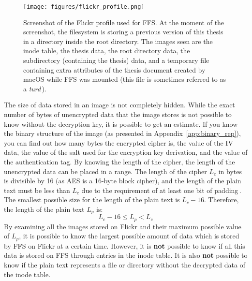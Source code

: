 \begin{figure}[!ht]
	\begin{center}
	  \texttt{[image: figures/flickr\_profile.png]}
	\end{center}
	\caption[Screenshot of the Flickr profile used for \gls{FFS}]{Screenshot of the Flickr profile used for \gls{FFS}. At the moment of the screenshot, the filesystem is storing a previous version of this thesis in a directory inside the root directory. The images seen are the inode table, the thesis data, the root directory data, the subdirectory (containing the thesis) data, and a temporary file containing extra attributes of the thesis document created by macOS while \gls{FFS} was mounted (this file is sometimes referred to as a \textit{turd}\,\cite{geekosaurAnswerWhyAre2011}).}
	\label{fig:flickr_profile}
\end{figure}

The size of data stored in an image is not completely hidden. While the exact number of bytes of unencrypted data that the image stores is not possible to know without the decryption key, it is possible to get an estimate. If you know the binary structure of the image (as presented in Appendix~\ref{app:binary_rep}), you can find out how many bytes the encrypted cipher is, the value of the \gls{IV} data, the value of the salt used for the encryption key derivation, and the value of the authentication tag. By knowing the length of the cipher, the length of the unencrypted data can be placed in a range. The length of the cipher $L_c$ in bytes is divisible by 16 (as \gls{AES} is a 16-byte block cipher), and the length of the plain text must be less than $L_c$ due to the requirement of at least one bit of padding\,\cite{z.z.coderAnswerSizeData2010}. The smallest possible size for the length of the plain text is $L_c - 16$. Therefore, the length of the plain text $L_p$ is:
$$
	L_c - 16 \leq L_p < L_c
$$
By examining all the images stored on Flickr and their maximum possible value of $L_p$, it is possible to know the largest possible amount of data which is stored by \gls{FFS} on Flickr at a certain time. However, it is \textbf{not} possible to know if all this data is stored on \gls{FFS} through entries in the inode table. It is also \textbf{not} possible to know if the plain text represents a file or directory without the decrypted data of the inode table.

